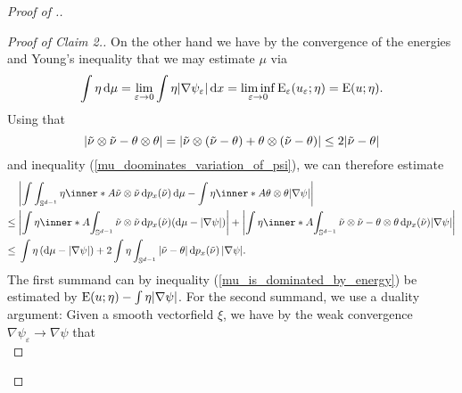 \begin{proof}[Proof of .]
\begin{proof}[Proof of Claim 2.]
		On the other hand we have by the convergence of the energies and 
		Young's inequality that we 
		may estimate $ \mu $ via 
		\begin{equation}
			\label{mu_is_dominated_by_energy}
			\int
				\eta
			\dd{ \mu }
			=
			\lim_{ \varepsilon \to 0 }
				\int
					\eta
					\abs{ \nabla \psi_{ \varepsilon } }
				\dd{ x }
			=
			\liminf_{ \varepsilon \to 0 }
				\operatorname{E}_{ \varepsilon } ( u_{ \varepsilon } ; \eta )
			=
			\operatorname{E} ( u ; \eta ).
		\end{equation}
		Using that
		\begin{equation*} 
			\abs{ \tilde{ \nu } \otimes \tilde{ \nu } - \theta \otimes \theta } 
			= 
			\abs{ 
				\tilde{ \nu } \otimes ( \tilde{ \nu } - \theta ) 
				+
				\theta \otimes ( \tilde{ \nu } - \theta ) 
			}
			\leq
			2 \abs{ \tilde{ \nu } - \theta }
		\end{equation*}
		and inequality (\ref{mu_doominates_variation_of_psi}), we can therefore 
		estimate
		\begin{align*}
			&
			\abs{ 
				\int
					\int_{ \mathbb{ S }^{ d - 1 } }
						\eta
						\inner*{ A }{ \tilde{ \nu } \otimes \tilde{ \nu } }
					\dd{ p_{ x } ( \tilde{ \nu } ) }
				\dd{ \mu }
				-
				\int
					\eta
					\inner*{ A }{ \theta \otimes \theta }
				\abs{ \nabla \psi }
			}
			\\
			\leq{} &
			\abs{ 
				\int
					\eta 
					\inner*{ A }
					{ 
						\int_{ \mathbb{ S }^{ d - 1 } }
							\tilde{ \nu } \otimes \tilde{ \nu }
						\dd{ p_{ x } ( \tilde{ \nu } ) }
					}
				( \dd{ \mu } - \abs{ \nabla \psi } )
			}
			+
			\abs{
				\int
					\eta
					\inner*{ A }{
						\int_{ \mathbb{ S }^{ d - 1 } }
							\tilde{ \nu } \otimes \tilde{ \nu }
							-
							\theta \otimes \theta
						\dd{ p_{ x } ( \tilde{ \nu } ) }
					}
				\abs{ \nabla \psi }
			}
			\\
			\leq {} &
			\int
				\eta
			\left( \dd{ \mu } - \abs{ \nabla \psi } \right)
			+
			2
			\int
				\eta
				\int_{ \mathbb{ S }^{ d - 1 } }
					\abs{ \tilde{ \nu } - \theta } 
				\dd{ p_{ x } ( \tilde{ \nu } ) }
			\abs{ \nabla \psi }.
		\end{align*}
		The first summand can by inequality (\ref{mu_is_dominated_by_energy}) 
		be estimated by 
		$ \operatorname{E} ( u ; \eta ) - \int \eta \abs{ \nabla \psi } $.
		For the second summand, we use a duality argument:
		Given a smooth vectorfield $ \xi $, we have by the weak convergence $ 
		\nabla \psi_{ \varepsilon } \to \nabla \psi $ that
		\begin{equation*}

\end{equation*}
\end{proof}
\end{proof}
